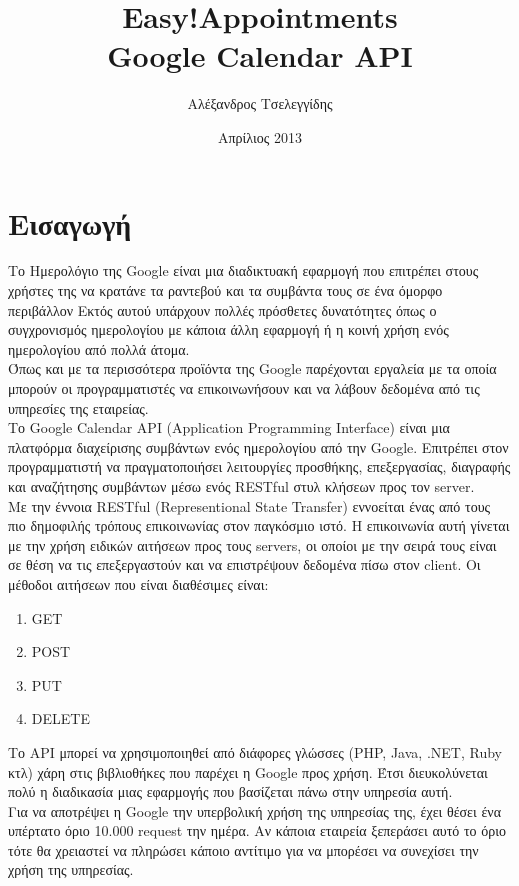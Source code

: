 \documentclass[12pt]{article}
\title{{\Huge {\bf Easy!Appointments}} \\[0.3cm] Google Calendar API}
\author{Αλέξανδρος Τσελεγγίδης}
\date{Απρίλιος 2013}
\begin{document}
\maketitle 
\thispagestyle{empty} %

\section {Εισαγωγή}
Το Ημερολόγιο της Google είναι μια διαδικτυακή εφαρμογή που επιτρέπει στους χρήστες της να κρατάνε τα ραντεβού και τα συμβάντα τους σε ένα όμορφο περιβάλλον Εκτός αυτού υπάρχουν πολλές πρόσθετες δυνατότητες όπως ο συγχρονισμός ημερολογίου με κάποια άλλη εφαρμογή ή η κοινή χρήση ενός ημερολογίου από πολλά άτομα.
\\[0.3cm]
Όπως και με τα περισσότερα προϊόντα της Google παρέχονται εργαλεία με τα οποία μπορούν οι προγραμματιστές να επικοινωνήσουν και να λάβουν δεδομένα από τις υπηρεσίες της εταιρείας.
\\[0.3cm]
Το Google Calendar API (Application Programming Interface) είναι μια πλατφόρμα διαχείρισης συμβάντων ενός ημερολογίου από την Google. Επιτρέπει στον προγραμματιστή να πραγματοποιήσει λειτουργίες προσθήκης, επεξεργασίας, διαγραφής και αναζήτησης συμβάντων μέσω ενός RESTful στυλ κλήσεων προς τον server.
\\[0.3cm]
Με την έννοια RESTful (Representional State Transfer)  εννοείται ένας από τους πιο δημοφιλής τρόπους επικοινωνίας στον παγκόσμιο ιστό. Η επικοινωνία αυτή γίνεται με την χρήση ειδικών αιτήσεων προς τους servers, οι οποίοι με την σειρά τους είναι σε θέση να τις επεξεργαστούν και να επιστρέψουν δεδομένα πίσω στον client. Οι μέθοδοι αιτήσεων που είναι διαθέσιμες είναι:
\begin{enumerate}
\item GET
\item POST
\item PUT
\item DELETE
\end{enumerate}

Το API μπορεί να χρησιμοποιηθεί από διάφορες γλώσσες (PHP, Java, .NET, Ruby κτλ) χάρη στις βιβλιοθήκες που παρέχει η Google προς χρήση. Έτσι διευκολύνεται πολύ η διαδικασία μιας εφαρμογής που βασίζεται πάνω στην υπηρεσία αυτή.
\\[0.3cm]
Για να αποτρέψει η Google την υπερβολική χρήση της υπηρεσίας της, έχει θέσει ένα υπέρτατο όριο 10.000 request την ημέρα. Αν κάποια εταιρεία ξεπεράσει αυτό το όριο τότε θα χρειαστεί να πληρώσει κάποιο αντίτιμο για να μπορέσει να συνεχίσει την χρήση της υπηρεσίας.
\end{document}
